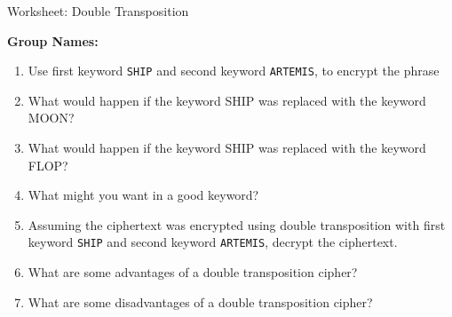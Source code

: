 \documentclass[12pt]{article}
\newcommand{\be}{\begin{enumerate}}
\newcommand{\ee}{\end{enumerate}}
\begin{document}
\begin{center}
{\Large  Worksheet:  Double Transposition	}
\end{center}

\noindent \textbf{Group Names:} \hrulefill \\
%
%
%


\be
\item Use first keyword {\tt SHIP} and second keyword {\tt ARTEMIS}, to encrypt the phrase 

%

\vfill

\vfill

\vfill

\item What would happen if the keyword SHIP was replaced with the keyword MOON?
\vfill
\item What would happen if the keyword SHIP was replaced with the keyword FLOP?
\vfill
\item What might you want in a good keyword?
\vfill
\newpage
\item 
Assuming the ciphertext was encrypted using double transposition with first keyword {\tt SHIP} and second keyword {\tt ARTEMIS}, decrypt the ciphertext.



\vfill

\vfill

\vfill

\vfill

\item What are some advantages of a double transposition cipher?

\vfill

\item What are some disadvantages of a double transposition cipher?

\vfill
\ee
\end{document}
